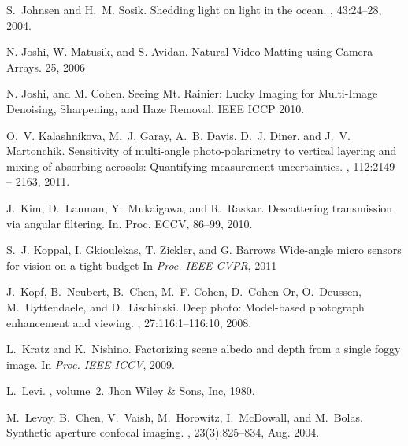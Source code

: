 \documentclass[10pt,twocolumn,letterpaper]{article}
\begin{document}
{\begin{thebibliography}{10}
S.~Johnsen and H.~M. Sosik.
\newblock Shedding light on light in the ocean.
, 43:24--28, 2004.

N. Joshi, W. Matusik, and S. Avidan.
\newblock Natural Video Matting using Camera Arrays.
 25, 2006

N. Joshi, and M. Cohen.
\newblock Seeing Mt. Rainier: Lucky Imaging for Multi-Image Denoising, Sharpening, and Haze Removal.
\newblock IEEE ICCP 2010.

O.~V. Kalashnikova, M.~J. Garay, A.~B. Davis, D.~J. Diner, and J.~V.
  Martonchik.
\newblock Sensitivity of multi-angle photo-polarimetry to vertical layering and
  mixing of absorbing aerosols: Quantifying measurement uncertainties.
,
  112:2149 -- 2163, 2011.

J.~Kim, D.~Lanman, Y.~Mukaigawa, and R.~Raskar.
\newblock Descattering transmission via angular filtering.
\newblock In. Proc. ECCV, 86--99, 2010.


S.~J. Koppal, I. Gkioulekas, T. Zickler, and G. Barrows
\newblock Wide-angle micro sensors for vision on a tight budget
\newblock In {\em Proc. IEEE CVPR}, 2011

J.~Kopf, B.~Neubert, B.~Chen, M.~F. Cohen, D.~Cohen-Or, O.~Deussen,
  M.~Uyttendaele, and D.~Lischinski.
\newblock Deep photo: Model-based photograph enhancement and viewing.
, 27:116:1--116:10, 2008.

L.~Kratz and K.~Nishino.
\newblock Factorizing scene albedo and depth from a single foggy image.
\newblock In {\em Proc. IEEE ICCV}, 2009.

L.~Levi.
, volume~2.
\newblock Jhon Wiley \& Sons, Inc, 1980.

M.~Levoy, B.~Chen, V.~Vaish, M.~Horowitz, I.~McDowall, and M.~Bolas.
\newblock Synthetic aperture confocal imaging.
, 23(3):825--834, Aug. 2004.



\end{thebibliography}}
\end{document}

